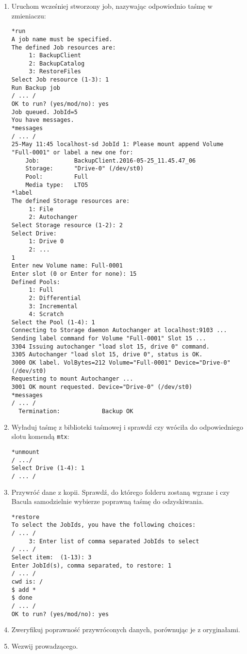 \documentclass[polish]{article}
\begin{document}
\begin{enumerate}

\item Uruchom wcześniej stworzony job, nazywając odpowiednio taśmę w zmieniaczu:
\begin{verbatim}
*run
A job name must be specified.
The defined Job resources are:
     1: BackupClient
     2: BackupCatalog
     3: RestoreFiles
Select Job resource (1-3): 1
Run Backup job
/ ... /
OK to run? (yes/mod/no): yes
Job queued. JobId=5
You have messages.
*messages
/ ... /
25-May 11:45 localhost-sd JobId 1: Please mount append Volume "Full-0001" or label a new one for:
    Job:          BackupClient.2016-05-25_11.45.47_06
    Storage:      "Drive-0" (/dev/st0)
    Pool:         Full
    Media type:   LTO5
*label
The defined Storage resources are:
     1: File
     2: Autochanger
Select Storage resource (1-2): 2
Select Drive:
     1: Drive 0
     2: ...
1
Enter new Volume name: Full-0001
Enter slot (0 or Enter for none): 15
Defined Pools:
     1: Full
     2: Differential
     3: Incremental
     4: Scratch
Select the Pool (1-4): 1
Connecting to Storage daemon Autochanger at localhost:9103 ...
Sending label command for Volume "Full-0001" Slot 15 ...
3304 Issuing autochanger "load slot 15, drive 0" command.
3305 Autochanger "load slot 15, drive 0", status is OK.
3000 OK label. VolBytes=212 Volume="Full-0001" Device="Drive-0" (/dev/st0)
Requesting to mount Autochanger ...
3001 OK mount requested. Device="Drive-0" (/dev/st0)
*messages
/ ... /
  Termination:            Backup OK
\end{verbatim}

\item Wyładuj taśmę z biblioteki taśmowej i sprawdź czy wróciła do odpowiedniego slotu komendą \texttt{mtx}:

\begin{verbatim}
*unmount
/ .../
Select Drive (1-4): 1
/ ... /
\end{verbatim}

\item Przywróć dane z kopii. Sprawdź, do którego folderu zostaną wgrane i czy Bacula samodzielnie wybierze poprawną taśmę do odzyskiwania.

\begin{verbatim}
*restore
To select the JobIds, you have the following choices:
/ ... /
     3: Enter list of comma separated JobIds to select
/ ... /
Select item:  (1-13): 3
Enter JobId(s), comma separated, to restore: 1
/ ... /
cwd is: /
$ add *
$ done
/ ... /
OK to run? (yes/mod/no): yes
\end{verbatim}

\item Zweryfikuj poprawność przywróconych danych, porównując je z oryginałami.

\item Wezwij prowadzącego.

\end{enumerate}
\end{document}
